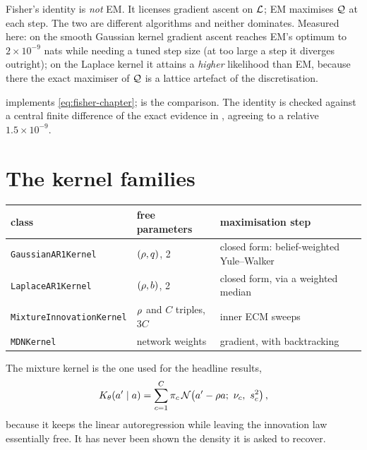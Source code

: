 \begin{pitfall}
Fisher's identity is \emph{not} EM. It licenses gradient ascent on $\mathcal{L}$; EM maximises
$\mathcal{Q}$ at each step. The two are different algorithms and neither dominates. Measured here:
on the smooth Gaussian kernel gradient ascent reaches EM's optimum to $2\times10^{-9}$ nats
while needing a tuned step size (at too large a step it diverges outright); on the Laplace
kernel it attains a \emph{higher} likelihood than EM, because there the exact maximiser of
$\mathcal{Q}$ is a lattice artefact of the discretisation.
\end{pitfall}

\begin{codebox}
 implements \eqref{eq:fisher-chapter};
 is the comparison. The identity
is checked against a central finite difference of the exact evidence in
, agreeing to a relative $1.5\times10^{-9}$.
\end{codebox}

\section{The kernel families}

\begin{center}\small
\begin{tabular}{@{}llp{7.2cm}@{}}
\toprule
class & free parameters & maximisation step \\
\midrule
\texttt{GaussianAR1Kernel} & $(\rho,q)$, 2 & closed form: belief-weighted Yule--Walker \\
\texttt{LaplaceAR1Kernel} & $(\rho,b)$, 2 & closed form, via a weighted median \\
\texttt{MixtureInnovationKernel} & $\rho$ and $C$ triples, $3C$ & inner ECM sweeps \\
\texttt{MDNKernel} & network weights & gradient, with backtracking \\
\bottomrule
\end{tabular}
\end{center}

The mixture kernel is the one used for the headline results,
\begin{equation}
\label{eq:mixture-kernel}
K_\theta(a'\mid a) = \sum_{c=1}^{C}\pi_c\,
\mathcal{N}\!\left(a'-\rho a;\ \nu_c,\ s_c^2\right),
\end{equation}
because it keeps the linear autoregression while leaving the innovation law essentially free.
It has never been shown the density it is asked to recover.

